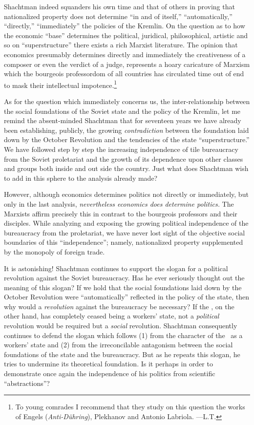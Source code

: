 Shachtman indeed squanders his own time and that of others in proving that nationalized property does not determine “in and of itself,” “automatically,” “directly,” “immediately” the policies of the Kremlin. On the question as to how the economic “base” determines the political, juridical, philosophical, artistic and so on “superstructure” there exists a rich Marxist literature. The opinion that economics presumably determines directly and immediately the creativeness of a composer or even the verdict of a judge, represents a hoary caricature of Marxism which the bourgeois professordom of all countries has circulated time out of end to mask their intellectual impotence.\footnote{To young comrades I recommend that they study on this question the works of Engels (\emph{Anti-Dühring}), Plekhanov and Antonio Labriola. ---L.T.}

As for the question which immediately concerns us, the inter-relationship between the social foundations of the Soviet state and the policy of the Kremlin, let me remind the absent-minded Shachtman that for seventeen years we have already been establishing, publicly, the growing \emph{contradiction} between the foundation laid down by the October Revolution and the tendencies of the state “superstructure.” We have followed step by step the increasing independence of tile bureaucracy from the Soviet proletariat and the growth of its dependence upon other classes and groups both inside and out side the country. Just what does Shachtman wish to add in this sphere to the analysis already made?

However, although economics determines politics not directly or immediately, but only in the last analysis, \emph{nevertheless economics does determine politics.} The Marxists affirm precisely this in contrast to the bourgeois professors and their disciples. While analyzing and exposing the growing political independence of the bureaucracy from the proletariat, we have never lost sight of the objective social boundaries of this “independence”; namely, nationalized property supplemented by the monopoly of foreign trade.

It is astonishing! Shachtman continues to support the slogan for a political revolution against the Soviet bureaucracy. Has he ever seriously thought out the meaning of this slogan? If we hold that the social foundations laid down by the October Revolution were “automatically” reflected in the policy of the state, then why would a \emph{revolution} against the bureaucracy be necessary? If the \USSR, on the other hand, has completely ceased being a workers’ state, not a \emph{political} revolution would be required but a \emph{social} revolution. Shachtman consequently continues to defend the slogan which follows (1) from the character of the \USSR\ as a workers’ state and (2) from the irreconcilable antagonism between the social foundations of the state and the bureaucracy. But as he repeats this slogan, he tries to undermine its theoretical foundation. Is it perhaps in order to demonstrate once again the independence of his politics from scientific “abstractions”?

